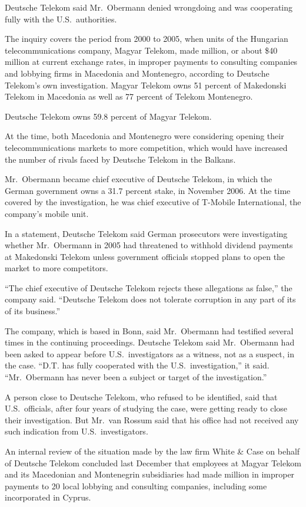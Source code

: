 ﻿\documentclass[12pt]{article}
\begin{document}
Deutsche Telekom said Mr.~Obermann denied wrongdoing and was cooperating fully with the
U.S.~authorities.

The inquiry covers the period from 2000 to 2005, when units of the Hungarian telecommunications
company, Magyar Telekom, made  million, or about \$40 million at current exchange rates,
in improper payments to consulting companies and lobbying firms in Macedonia and Montenegro,
according to Deutsche Telekom's own investigation. Magyar Telekom owns 51 percent of Makedonski
Telekom in Macedonia as well as 77 percent of Telekom Montenegro.

Deutsche Telekom owns 59.8 percent of Magyar Telekom.

At the time, both Macedonia and Montenegro were considering opening their telecommunications markets
to more competition, which would have increased the number of rivals faced by Deutsche Telekom in
the Balkans.

Mr.~Obermann became chief executive of Deutsche Telekom, in which the German government owns a 31.7
percent stake, in November 2006. At the time covered by the investigation, he was chief executive of
T-Mobile International, the company's mobile unit.

In a statement, Deutsche Telekom said German prosecutors were investigating whether Mr.~Obermann in
2005 had threatened to withhold dividend payments at Makedonski Telekom unless government officials
stopped plans to open the market to more competitors.

``The chief executive of Deutsche Telekom rejects these allegations as false,'' the company said.
``Deutsche Telekom does not tolerate corruption in any part of its of its business.''

The company, which is based in Bonn, said Mr.~Obermann had testified several times in the continuing
proceedings. Deutsche Telekom said Mr.~Obermann had been asked to appear before U.S.~investigators
as a witness, not as a suspect, in the case. ``D.T. has fully cooperated with the
U.S.~investigation,'' it said. ``Mr.~Obermann has never been a subject or target of the
investigation.''

A person close to Deutsche Telekom, who refused to be identified, said that U.S.~officials, after
four years of studying the case, were getting ready to close their investigation. But Mr.~van Rossum
said that his office had not received any such indication from U.S.~investigators.

An internal review of the situation made by the law firm White \& Case on behalf of Deutsche Telekom
concluded last December that employees at Magyar Telekom and its Macedonian and Montenegrin
subsidiaries had made  million in improper payments to 20 local lobbying and consulting
companies, including some incorporated in Cyprus.
\end{document}
